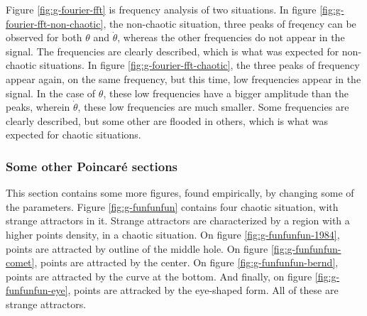 \documentclass[a4paper,12pt,twoside]{article}
\begin{document}
Figure \ref{fig:g-fourier-fft} is frequency analysis of two situations.
In figure \ref{fig:g-fourier-fft-non-chaotic}, the non-chaotic situation, three peaks of freqency can be observed for both $\theta$ and $\dot{\theta}$, whereas the other frequencies do not appear in the signal.
The frequencies are clearly described, which is what was expected for non-chaotic situations.
In figure \ref{fig:g-fourier-fft-chaotic}, the three peaks of frequency appear again, on the same frequency, but this time, low frequencies appear in the signal.
In the case of $\theta$, these low frequencies have a bigger amplitude than the peaks, wherein $\dot{\theta}$, these low frequencies are much smaller.
Some frequencies are clearly described, but some other are flooded in others, which is what was expected for chaotic situations.

\subsubsection{Some other Poincaré sections}
This section contains some more figures, found empirically, by changing some of the parameters.
Figure \ref{fig:g-funfunfun} contains four chaotic situation, with strange attractors in it.
Strange attractors are characterized by a region with a higher points density, in a chaotic situation.
On figure \ref{fig:g-funfunfun-1984}, points are attracted by outline of the middle hole.
On figure \ref{fig:g-funfunfun-comet}, points are attracted by the center.
On figure \ref{fig:g-funfunfun-bernd}, points are attracted by the curve at the bottom.
And finally, on figure \ref{fig:g-funfunfun-eye}, points are attracked by the eye-shaped form. All of these are strange attractors.
\end{document}

